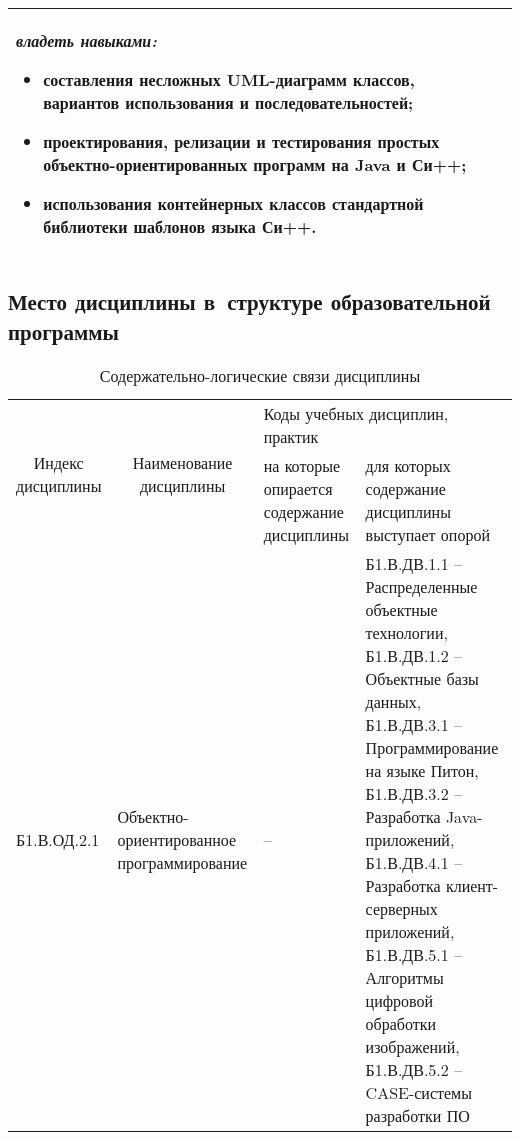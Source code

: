 \documentclass[a4paper,12pt]{article}
\begin{document}
\begin{longtable}{|p{54mm}|p{100mm}|}
  \emph{владеть навыками:}
  \begin{itemize}[leftmargin=12pt]
    \item составления несложных UML-диаграмм классов, вариантов использования и последовательностей; 
    \item проектирования, релизации и тестирования простых объектно-ориентированных программ на Java и Си++; 
    \item использования контейнерных классов стандартной библиотеки шаблонов языка Си++. 
  \end{itemize}
  
  \\
  \hline
  \end{longtable}


\subsection{Место дисциплины в~структуре образовательной программы}

  \begin{table}[H]
  \setlength\arraycolsep{3pt}
  \caption{Содержательно-логические связи дисциплины}
  \begin{tabular}{|l|p{18ex}|*{2}{p{23ex}|}}
  \hline
  \multicolumn{1}{|c|}{\multirow{2}{13ex}{\centering Индекс \linebreak дисциплины}} &
  \multicolumn{1}{c|}{\multirow{2}{18ex}{\centering Наименование \linebreak дисциплины}} & 
  \multicolumn{2}{p{46ex}|}{\centering Коды учебных дисциплин, практик} \\
  \cline{3-4}
   & & 
  \centering на которые опирается содержание дисциплины & 
  \centering\arraybackslash для которых содержание дисциплины выступает опорой
  \\ \hline
  Б1.В.ОД.2.1 & Объектно-ориентированное программирование 
  & 
  \raggedright
  
  -- 
  & 
  \raggedright\arraybackslash
  
  Б1.В.ДВ.1.1 -- Распределенные объектные технологии,
  Б1.В.ДВ.1.2 -- Объектные базы данных,
  Б1.В.ДВ.3.1 -- Программирование на языке Питон,
  Б1.В.ДВ.3.2 -- Разработка Java-приложений,
  Б1.В.ДВ.4.1 -- Разработка клиент-серверных приложений,
  Б1.В.ДВ.5.1 -- Алгоритмы цифровой обработки изображений,
  Б1.В.ДВ.5.2 -- CASE-системы разработки ПО 
  \\ \hline
  \end{tabular}
  \end{table}
\end{document}
